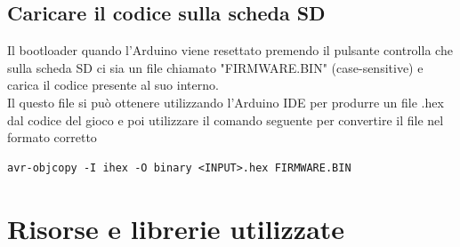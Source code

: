 \documentclass[a4paper,12pt]{article}
\begin{document}
\subsection{Caricare il codice sulla scheda SD}
Il bootloader quando l'Arduino viene resettato premendo il pulsante controlla
che sulla scheda SD ci sia un file chiamato "FIRMWARE.BIN" (case-sensitive) e
carica il codice presente al suo interno.
\\
Il questo file si pu\`o ottenere utilizzando l'Arduino IDE per produrre un file
.hex dal codice del gioco e poi utilizzare il comando seguente per convertire il
file nel formato corretto
\begin{lstlisting}
avr-objcopy -I ihex -O binary <INPUT>.hex FIRMWARE.BIN
\end{lstlisting}

\section{Risorse e librerie utilizzate}
\end{document}
